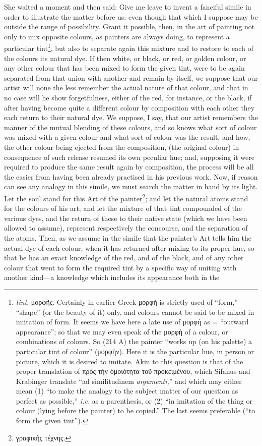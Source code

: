 She waited a moment and then said: Give me leave to invent a fanciful simile in order to illustrate the matter before us: even though that which I suppose may be outside the range of possibility. Grant it possible, then, in the art of painting not only to mix opposite colours, as painters are always doing, to represent a particular tint\footnote{\emph{tint}, \textgreek{μορφῆς}. Certainly in earlier Greek \textgreek{μορφὴ} is strictly used of “form,” “shape” (or the beauty of it) only, and colours cannot be said to be mixed in imitation of form. It seems we have here a late use of \textgreek{μορφὴ} as = “outward appearance”; so that we may even speak of the \textgreek{μορφὴ} of a colour, or combinations of colours. So (214 A) the painter “works up (on his palette) a particular tint of colour” (\textgreek{μορφὴν}). Here it is the particular hue, in person or picture, which it is desired to imitate. Akin to this question is that of the proper translation of \textgreek{πρὸς τὴν ὁμοιότητα τοῦ προκειμένου}, which Sifanus and Krabinger translate “ad similitudinem \emph{argumenti,}” and which may either mean (1) “to make the analogy to the subject matter of our question as perfect as possible,” \emph{i.e.} as a parenthesis, or (2) “in imitation of the thing or colour (lying before the painter) to be copied.” The last seems preferable (“to form the given tint”).}, but also to separate again this mixture and to restore to each of the colours its natural dye. If then white, or black, or red, or golden colour, or any other colour that has been mixed to form the given tint, were to be again separated from that union with another and remain by itself, we suppose that our artist will none the less remember the actual nature of that colour, and that in no case will he show forgetfulness, either of the red, for instance, or the black, if after having become quite a different colour by composition with each other they each return to their natural dye. We suppose, I say, that our artist remembers the manner of the mutual blending of these colours, and so knows what sort of colour was mixed with a given colour and what sort of colour was the result, and how, the other colour being ejected from the composition, (the original colour) in consequence of such release resumed its own peculiar hue; and, supposing it were required to produce the same result again by composition, the process will be all the easier from having been already practised in his previous work. Now, if reason can see any analogy in this simile, we must search the matter in hand by its light. Let the soul stand for this Art of the painter\footnote{\textgreek{γραφικῆς τέχνης}.}; and let the natural atoms stand for the colours of his art; and let the mixture of that tint compounded of the various dyes, and the return of these to their native state (which we have been allowed to assume), represent respectively the concourse, and the separation of the atoms. Then, as we assume in the simile that the painter’s Art tells him the actual dye of each colour, when it has returned after mixing to its proper hue, so that he has an exact knowledge of the red, and of the black, and of any other colour that went to form the required tint by a specific way of uniting with another kind—a knowledge which includes its appearance both in the 